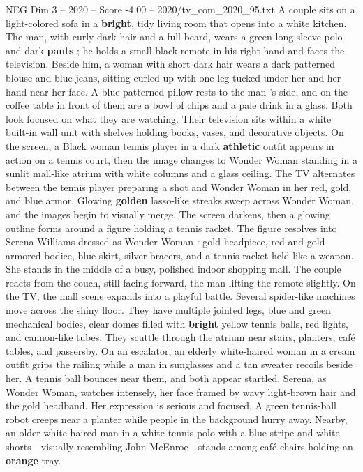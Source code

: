 \begin{textsample}{NEG Dim 3 – 2020 – Score -4.00 – 2020/tv\_com\_2020\_95.txt}  \label{ex:f3_neg_021}
A couple sits on a light-colored sofa in a \textbf{bright}, tidy living room that opens into a white kitchen.
The man, with curly dark hair and a full beard, wears a green long-sleeve polo and dark \textbf{pants} ; he holds a small black remote in his right hand and faces the television.
Beside him, a woman with short dark hair wears a dark patterned blouse and blue jeans, sitting curled up with one leg tucked under her and her hand near her face.
A blue patterned pillow rests to the man ’s side, and on the coffee table in front of them are a bowl of chips and a pale drink in a glass.
Both look focused on what they are watching.
Their television sits within a white built-in wall unit with shelves holding books, vases, and decorative objects.
On the screen, a Black woman tennis player in a dark \textbf{athletic} outfit appears in action on a tennis court, then the image changes to Wonder Woman standing in a sunlit mall-like atrium with white columns and a glass ceiling.
The TV alternates between the tennis player preparing a shot and Wonder Woman in her red, gold, and blue armor.
Glowing \textbf{golden} lasso-like streaks sweep across Wonder Woman, and the images begin to visually merge.
The screen darkens, then a glowing outline forms around a figure holding a tennis racket.
The figure resolves into Serena Williams dressed as Wonder Woman : gold headpiece, red-and-gold armored bodice, blue skirt, silver bracers, and a tennis racket held like a weapon.
She stands in the middle of a busy, polished indoor shopping mall.
The couple reacts from the couch, still facing forward, the man lifting the remote slightly.
On the TV, the mall scene expands into a playful battle.
Several spider-like machines move across the shiny floor.
They have multiple jointed legs, blue and green mechanical bodies, clear domes filled with \textbf{bright} yellow tennis balls, red lights, and cannon-like tubes.
They scuttle through the atrium near stairs, planters, café tables, and passersby.
On an escalator, an elderly white-haired woman in a cream outfit grips the railing while a man in sunglasses and a tan sweater recoils beside her.
A tennis ball bounces near them, and both appear startled.
Serena, as Wonder Woman, watches intensely, her face framed by wavy light-brown hair and the gold headband.
Her expression is serious and focused.
A green tennis-ball robot creeps near a planter while people in the background hurry away.
Nearby, an older white-haired man in a white tennis polo with a blue stripe and white shorts—visually resembling John McEnroe—stands among café chairs holding an \textbf{orange} tray.

\end{textsample}
